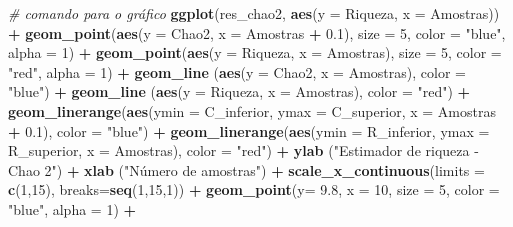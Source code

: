\documentclass[
]{book}
\newenvironment{Shaded}{\begin{snugshade}}{\end{snugshade}}
\newcommand{\CommentTok}[1]{\textcolor[rgb]{0.56,0.35,0.01}{\textit{#1}}}
\newcommand{\DataTypeTok}[1]{\textcolor[rgb]{0.13,0.29,0.53}{#1}}
\newcommand{\DecValTok}[1]{\textcolor[rgb]{0.00,0.00,0.81}{#1}}
\newcommand{\FloatTok}[1]{\textcolor[rgb]{0.00,0.00,0.81}{#1}}
\newcommand{\KeywordTok}[1]{\textcolor[rgb]{0.13,0.29,0.53}{\textbf{#1}}}
\newcommand{\NormalTok}[1]{#1}
\newcommand{\OperatorTok}[1]{\textcolor[rgb]{0.81,0.36,0.00}{\textbf{#1}}}
\newcommand{\StringTok}[1]{\textcolor[rgb]{0.31,0.60,0.02}{#1}}
\begin{document}
\begin{Shaded}
\begin{Highlighting}[]
\CommentTok{# comando para o gráfico}
\KeywordTok{ggplot}\NormalTok{(res_chao2, }\KeywordTok{aes}\NormalTok{(}\DataTypeTok{y =}\NormalTok{ Riqueza, }\DataTypeTok{x =}\NormalTok{ Amostras)) }\OperatorTok{+}
\StringTok{  }\KeywordTok{geom_point}\NormalTok{(}\KeywordTok{aes}\NormalTok{(}\DataTypeTok{y =}\NormalTok{ Chao2, }\DataTypeTok{x =}\NormalTok{ Amostras }\OperatorTok{+}\StringTok{ }\FloatTok{0.1}\NormalTok{), }\DataTypeTok{size =} \DecValTok{5}\NormalTok{, }\DataTypeTok{color =} \StringTok{"blue"}\NormalTok{, }\DataTypeTok{alpha =} \DecValTok{1}\NormalTok{) }\OperatorTok{+}
\StringTok{  }\KeywordTok{geom_point}\NormalTok{(}\KeywordTok{aes}\NormalTok{(}\DataTypeTok{y =}\NormalTok{ Riqueza, }\DataTypeTok{x =}\NormalTok{ Amostras), }\DataTypeTok{size =} \DecValTok{5}\NormalTok{, }\DataTypeTok{color =} \StringTok{"red"}\NormalTok{, }\DataTypeTok{alpha =} \DecValTok{1}\NormalTok{) }\OperatorTok{+}
\StringTok{  }\KeywordTok{geom_line}\NormalTok{ (}\KeywordTok{aes}\NormalTok{(}\DataTypeTok{y =}\NormalTok{ Chao2, }\DataTypeTok{x =}\NormalTok{ Amostras), }\DataTypeTok{color =} \StringTok{"blue"}\NormalTok{) }\OperatorTok{+}
\StringTok{  }\KeywordTok{geom_line}\NormalTok{ (}\KeywordTok{aes}\NormalTok{(}\DataTypeTok{y =}\NormalTok{ Riqueza, }\DataTypeTok{x =}\NormalTok{ Amostras), }\DataTypeTok{color =} \StringTok{"red"}\NormalTok{) }\OperatorTok{+}
\StringTok{  }\KeywordTok{geom_linerange}\NormalTok{(}\KeywordTok{aes}\NormalTok{(}\DataTypeTok{ymin =}\NormalTok{ C_inferior, }\DataTypeTok{ymax =}\NormalTok{ C_superior, }\DataTypeTok{x =}\NormalTok{ Amostras }\OperatorTok{+}\StringTok{ }\FloatTok{0.1}\NormalTok{),}
 \DataTypeTok{color =} \StringTok{"blue"}\NormalTok{) }\OperatorTok{+}
\StringTok{  }\KeywordTok{geom_linerange}\NormalTok{(}\KeywordTok{aes}\NormalTok{(}\DataTypeTok{ymin =}\NormalTok{ R_inferior, }\DataTypeTok{ymax =}\NormalTok{ R_superior, }\DataTypeTok{x =}\NormalTok{ Amostras), }\DataTypeTok{color =} \StringTok{"red"}\NormalTok{) }\OperatorTok{+}
\StringTok{  }\KeywordTok{ylab}\NormalTok{ (}\StringTok{"Estimador de riqueza - Chao 2"}\NormalTok{) }\OperatorTok{+}
\StringTok{  }\KeywordTok{xlab}\NormalTok{ (}\StringTok{"Número de amostras"}\NormalTok{) }\OperatorTok{+}
\StringTok{  }\KeywordTok{scale_x_continuous}\NormalTok{(}\DataTypeTok{limits =} \KeywordTok{c}\NormalTok{(}\DecValTok{1}\NormalTok{,}\DecValTok{15}\NormalTok{), }\DataTypeTok{breaks=}\KeywordTok{seq}\NormalTok{(}\DecValTok{1}\NormalTok{,}\DecValTok{15}\NormalTok{,}\DecValTok{1}\NormalTok{)) }\OperatorTok{+}
\StringTok{  }\KeywordTok{geom_point}\NormalTok{(}\DataTypeTok{y=} \FloatTok{9.8}\NormalTok{, }\DataTypeTok{x =} \DecValTok{10}\NormalTok{, }\DataTypeTok{size =} \DecValTok{5}\NormalTok{, }\DataTypeTok{color =} \StringTok{"blue"}\NormalTok{, }\DataTypeTok{alpha =} \DecValTok{1}\NormalTok{) }\OperatorTok{+}\StringTok{ }

\end{Highlighting}
\end{Shaded}
\end{document}
